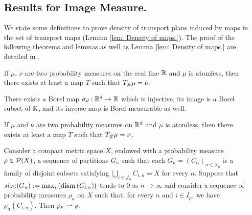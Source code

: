 \subsection{Results for Image Measure.}
We state some definitions to prove density of transport plans induced by maps in the set of transport maps (Lemma \ref{lem: Density of maps.}). The proof of the following theorems and lemmas as well as Lemma \ref{lem: Density of maps.} are detailed in \cite{Santambrogio2015OT}.

\begin{lemma}
If $\mu$, $\nu$ are two probability measures on the real line $\mathbb{R}$ and $\mu$ is atomless, then there exists at least a map $T$ such that ${T}_{\#} \mu=\nu$.
\end{lemma}
	
\begin{lemma}
There exists a Borel map $\sigma_d: \mathbb{R}^d\rightarrow \mathbb{R}$ which is injective, its image is a Borel subset of $\mathbb{R}$, and its inverse map is Borel measurable as well.
\end{lemma}
		
\begin{theorem}
	If $\mu$ and $\nu$ are two probability measures on $\mathbb{R}^d$ and $\mu$ is atomless, then there exists at least a map $T$ such that ${T}_{\#} \mu=\nu$.
\end{theorem}
			
\begin{theorem}
	Consider a compact metric space $X$, endowed with a probability measure $\rho \in \mathcal{P}(X)$, a sequence of partitions $G_n$ such that each $G_n=(C_\alpha)_{\alpha \in \mathcal{J}_n}$ is a family of disjoint subsets satisfying $\bigcup_{i\in \mathcal{J}_n}C_{i,n}=X$ for every $n$. Suppose that $size(G_n):=\max_i \left( \mathrm{diam}\left( C_{i,n} \right) \right)$ tends to $0$ as $n\rightarrow \infty$ and consider a sequence of probability measures $\rho_n$ on $X$ such that, for every $n$ and $i\in I_p$, we have $\rho_n(C_{i,n})$. Then $\rho_n\rightharpoonup\rho$.
\end{theorem}
